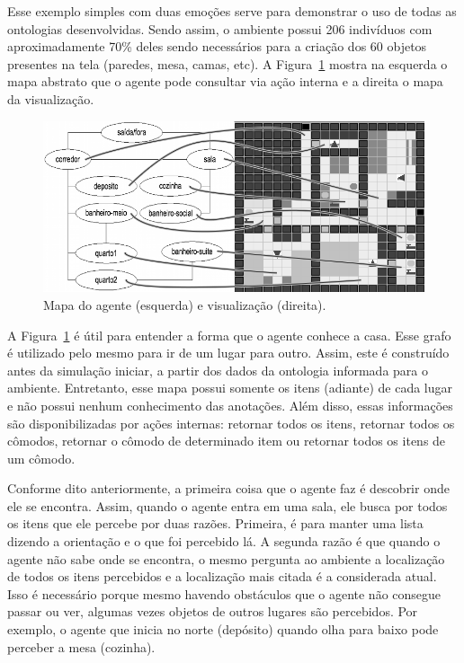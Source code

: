 Esse exemplo simples com duas emoções serve para demonstrar o uso de todas as
ontologias desenvolvidas. Sendo assim, o ambiente possui 206 indivíduos com
aproximadamente 70\% deles sendo necessários para a criação dos 60 objetos
presentes na tela (paredes, mesa, camas, etc). A
Figura~\ref{fig:abstractWindow} mostra na esquerda o mapa abstrato que o agente
pode consultar via ação interna e a direita o mapa da visualização.

\begin{figure}
	\begin{center}
		\includegraphics[width=140mm]{figuras/visualization.png}
	\end{center}
	\caption{Mapa do agente (esquerda) e visualização (direita).}
	\label{fig:abstractWindow}
\end{figure}

A Figura~\ref{fig:abstractWindow} é útil para entender a forma que o agente
conhece a casa. Esse grafo é utilizado pelo mesmo para ir de um lugar para
outro. Assim, este é construído antes da simulação iniciar, a partir dos dados
da ontologia informada para o ambiente. Entretanto, esse mapa possui somente
os itens (adiante) de cada lugar e não possui nenhum conhecimento das anotações.
Além disso, essas informações são disponibilizadas por ações
internas: retornar todos os itens, retornar todos os cômodos, retornar o
cômodo de determinado item ou retornar todos os itens de um cômodo.

Conforme dito anteriormente, a primeira coisa que o agente faz é descobrir
onde ele se encontra. Assim, quando o agente entra em uma sala, ele busca por
todos os itens que ele percebe por duas razões. Primeira, é para manter uma
lista dizendo a orientação e o que foi percebido lá. A segunda razão é que
quando o agente não sabe onde se encontra, o mesmo pergunta ao ambiente a
localização de todos os itens percebidos e a localização mais citada é a
considerada atual. Isso é necessário porque mesmo havendo obstáculos que o
agente não consegue passar ou ver, algumas vezes objetos de outros lugares são
percebidos. Por exemplo, o agente que inicia no norte (depósito) quando olha
para baixo pode perceber a mesa (cozinha).

